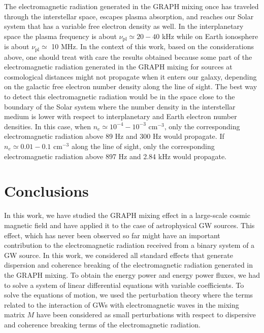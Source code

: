 \documentclass[a4paper,11pt]{article}
\begin{document}
The electromagnetic radiation generated in the GRAPH mixing once has traveled through the interstellar space, escapes plasma absorption, and reaches our Solar system that has a variable free electron density as well. In the interplanetary space the plasma frequency is about $\nu_\text{pl}\simeq 20-40$ kHz while on Earth ionosphere is about $\nu_\text{pl}\simeq$ 10 MHz. In the context of this work, based on the considerations above, one should treat with care the results obtained because some part of the electromagnetic radiation generated in the GRAPH mixing for sources at cosmological distances might not propagate when it enters our galaxy, depending on the galactic free electron number density along the line of sight. The best way to detect this electromagnetic radiation would be in the space close to the boundary of the Solar system where the number density in the interstellar medium is lower with respect to interplanetary and Earth electron number densities. In this case, when $n_e \simeq 10^{-4}-10^{-3}$ cm$^{-3}$, only the corresponding electromagnetic radiation above 89 Hz and 300 Hz would propagate. If $n_e\simeq 0.01-0.1$ cm$^{-3}$ along the line of sight, only the corresponding electromagnetic radiation above 897 Hz and 2.84 kHz would propagate. 




















\section{Conclusions}
\label{sec:9}



In this work, we have studied the GRAPH mixing effect in a large-scale cosmic magnetic field and have applied it to the case of astrophysical GW sources. This effect, which has never been observed so far might have an important contribution to the electromagnetic radiation received from a binary system of a GW source. In this work, we considered all standard effects that generate dispersion and coherence breaking of the electromagnetic radiation generated in the GRAPH mixing. To obtain the energy power and energy power fluxes, we had to solve a system of linear differential equations with variable coefficients. To solve the equations of motion, we used the perturbation theory where 
the terms related to the interaction of GWs with electromagnetic waves in the mixing matrix $M$ have been considered as small perturbations with respect to dispersive and coherence breaking terms of the electromagnetic radiation.
\end{document}

